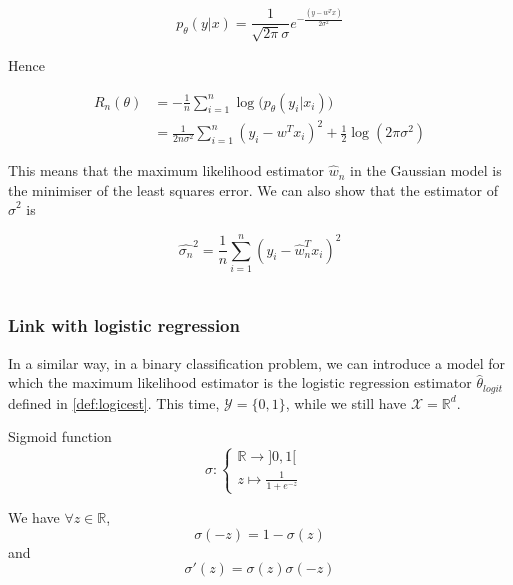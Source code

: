 \documentclass[
10pt, %
a4paper, %
oneside, %
headinclude,footinclude, %
BCOR5mm, %
]{scrartcl}
\begin{document}
\begin{equation}
    p_{\theta}(y|x) = \frac{1}{ \sqrt{2\pi} \sigma} e^{- \frac{(y-w^Tx)}{2\sigma^2} }
\end{equation}

Hence 

\begin{equation}
    \begin{aligned}
	R_n(\theta) &= - \frac{1}{n} \sum^{n}_{i=1} \log\big(p_{\theta}(y_i|x_i)\big)\\
	&= \frac{1}{2n\sigma^2} \sum^{n}_{i=1} (y_i-w^Tx_i)^2+ \frac{1}{2} \log(2\pi \sigma^2)
    \end{aligned}
\end{equation}

This means that the maximum likelihood estimator $ \hat{w}_n$ in the Gaussian model is the minimiser of the least squares error. We can also show that the estimator of $ \hat{\sigma}^2$ is

\begin{equation*}
    \hat{\sigma_n}^2 = \frac{1}{n} \sum^{n}_{i=1} (y_i- \hat{w}_n^Tx_i)^2
\end{equation*}
\\

\subsubsection{\large\color{Periwinkle}Link with logistic regression}

In a similar way, in a binary classification problem, we can introduce a model for which the maximum likelihood estimator is the logistic regression estimator $\hat{\theta}_{logit}$ defined in \ref{def:logicest}. This time, $ \mathcal{Y} = \{0, 1\}$, while we still have $ \mathcal{X}=\mathbb{R}^d$.

\begin{definition}{Sigmoid function}
$$
\sigma  : \left\{
    \begin{array}{ll}
	\mathbb{R} \rightarrow ]0, 1[ \\
	z \mapsto \frac{1}{1+e^{-z}} & 
    \end{array}
\right.
$$

We have $\forall z\in \mathbb{R} $,
\begin{equation*}
    \sigma(-z) = 1- \sigma(z)
\end{equation*}
and
\begin{equation*}
    \sigma'(z) = \sigma(z)\sigma(-z)
\end{equation*}
\end{definition}
\end{document}
